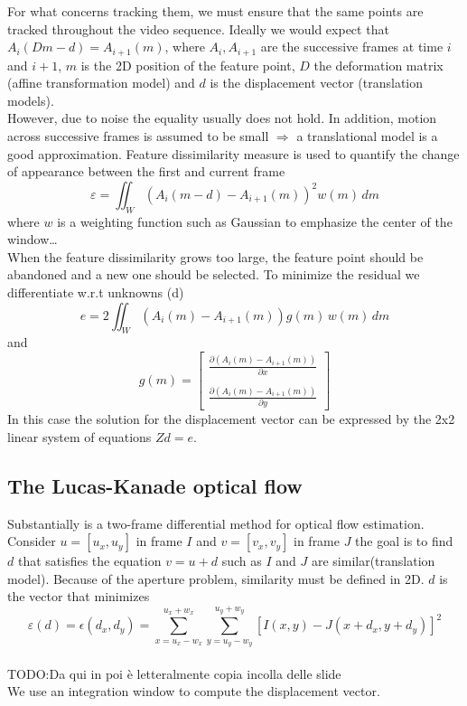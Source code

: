 For what concerns tracking them, we must ensure that the same points are tracked throughout the video sequence. 
Ideally we would expect that $A_i(Dm-d)=A_{i+1}(m)$, where $A_i, A_{i+1}$ are the successive frames at time $i$ and $i+1$, $m$ is the 2D position of the feature point, $D$ the deformation matrix (affine transformation model) and $d$ is the displacement vector (translation models).
\\ However, due to noise the equality usually does not hold. In addition, motion across successive frames is assumed to be small $\Rightarrow$ a translational model is a good approximation.
Feature dissimilarity measure is used to quantify the change of appearance between the first and current frame
\[
    \varepsilon = \iint_{W} \left(A_i(m-d)-A_{i+1}(m)\right)^2 w(m) \, dm
\]
where $w$ is a weighting function such as Gaussian to emphasize the center of the window\dots
\\When the feature dissimilarity grows too large, the feature point should be abandoned and a new one should be selected.
To minimize the residual we differentiate w.r.t unknowns (d)
\[
    e = 2 \iint_{W} \left(A_i(m)-A_{i+1}(m)\right)g(m) \, w(m) \, dm
\] 
and 
\[
    g(m)=\begin{bmatrix}
        \frac{\partial (A_i(m)-A_{i+1}(m))}{\partial x} \\
        \\
        \frac{\partial (A_i(m)-A_{i+1}(m))}{\partial y} 
    \end{bmatrix}
\]
In this case the solution for the displacement vector can be expressed by the 2x2 linear system of equations $Zd = e$.
\subsection{The Lucas-Kanade optical flow}
Substantially is a two-frame differential method for optical flow estimation.
Consider $u=\left[u_x, u_y\right]$ in frame $I$ and $v=\left[v_x, v_y\right]$ in frame $J$ the goal is to find $d$ that satisfies the equation $v = u + d$ such as $I$ and $J$ are similar(translation model).
Because of the aperture problem, similarity must be defined in 2D.
$d$ is the vector that minimizes
\[
    \varepsilon(d) = \epsilon(d_x, d_y) = \sum_{x=u_x-w_x}^{u_x+w_x} \sum_{y=u_y-w_y}^{u_y+w_y} \left[I(x, y) - J(x+d_x, y+d_y)\right]^2
\]
\\TODO:Da qui in poi è letteralmente copia incolla delle slide\\
We use an integration window to compute the displacement vector. 


